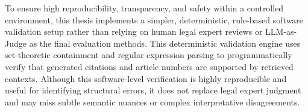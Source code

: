 To ensure high reproducibility, transparency, and safety within a controlled environment, this thesis implements a simpler, deterministic, rule-based software validation setup rather than relying on human legal expert reviews or LLM-as-Judge as the final evaluation methods. This deterministic validation engine uses set-theoretic containment and regular expression parsing to programmatically verify that generated citations and article numbers are supported by retrieved contexts. Although this software-level verification is highly reproducible and useful for identifying structural errors, it does not replace legal expert judgment and may miss subtle semantic nuances or complex interpretative disagreements.
